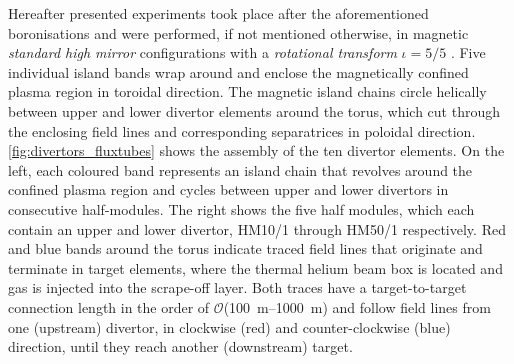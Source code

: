 %
        Hereafter presented experiments took place after the aforementioned boronisations and were performed, if not mentioned otherwise, in magnetic \textit{standard high mirror} configurations with a \textit{rotational transform} $\iota=5/5$ \cite{Geiger2014,Effenberg2019_seed}. Five individual island bands wrap around and enclose the magnetically confined plasma region in toroidal direction. The magnetic island chains circle helically between upper and lower divertor elements around the torus, which cut through the enclosing field lines and corresponding separatrices in poloidal direction\cite{Mayer2020}. \autoref{fig:divertors_fluxtubes} shows the assembly of the ten divertor elements. On the left, each coloured band represents an island chain that revolves around the confined plasma region and cycles between upper and lower divertors in consecutive half-modules\cite{Reimold2021}. The right shows the five half modules, which each contain an upper and lower divertor, HM10/1 through HM50/1 respectively. Red and blue bands around the torus indicate traced field lines that originate and terminate in target elements, where the thermal helium beam box is located and gas is injected into the scrape-off layer. Both traces have a target-to-target connection length in the order of $\mathcal{O}$(\SIrange{100}{1000}{\meter}) and follow field lines from one (upstream) divertor, in clockwise (red) and counter-clockwise (blue) direction, until they reach another (downstream) target\cite{Effenberg2019_seed}.%
%
